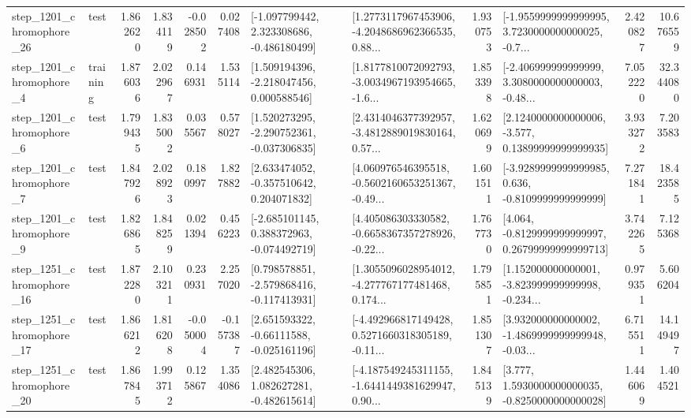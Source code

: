 \begin{tabular}{llrrrrllrlrr}
 step\_1201\_chromophore\_26 &      test &      1.862620 &    1.834119 &     -0.028502 &  0.027408 &   [-1.097799442, 2.323308686, -0.486180499] &  [1.2773117967453906, -4.2048686962366535, 0.88... &       1.930753 &  [-1.9559999999999995, 3.7230000000000025, -0.7... &            2.420827 &         10.676559 \\
  step\_1201\_chromophore\_4 &  training &      1.876036 &    2.022967 &      0.146931 &  1.535114 &    [1.509194396, -2.218047456, 0.000588546] &  [1.8177810072092793, -3.0034967193954665, -1.6... &       1.853398 &  [-2.406999999999999, 3.3080000000000003, -0.48... &            7.052220 &         32.344080 \\
  step\_1201\_chromophore\_6 &      test &      1.799435 &    1.835002 &      0.035567 &  0.578027 &   [1.520273295, -2.290752361, -0.037306835] &  [2.4314046377392957, -3.4812889019830164, 0.57... &       1.620699 &  [2.1240000000000006, -3.577, 0.13899999999999935] &            3.933272 &          7.203583 \\
  step\_1201\_chromophore\_7 &      test &      1.847926 &    2.028923 &      0.180997 &  1.827882 &    [2.633474052, -0.357510642, 0.204071832] &  [4.060976546395518, -0.5602160653251367, -0.49... &       1.601511 &  [-3.9289999999999985, 0.636, -0.8109999999999999] &            7.271841 &         18.423585 \\
  step\_1201\_chromophore\_9 &      test &      1.826865 &    1.848259 &      0.021394 &  0.456223 &   [-2.685101145, 0.388372963, -0.074492719] &  [4.405086303330582, -0.6658367357278926, -0.22... &       1.767730 &  [4.064, -0.8129999999999997, 0.26799999999999713] &            3.742265 &          7.125368 \\
 step\_1251\_chromophore\_16 &      test &      1.872280 &    2.103211 &      0.230931 &  2.257020 &   [0.798578851, -2.579868416, -0.117413931] &  [1.3055096028954012, -4.277767177481468, 0.174... &       1.795851 &  [1.152000000000001, -3.823999999999998, -0.234... &            0.979351 &          5.606204 \\
 step\_1251\_chromophore\_17 &      test &      1.866212 &    1.816208 &     -0.050004 & -0.157387 &    [2.651593322, -0.66111588, -0.025161196] &  [-4.492966817149428, 0.5271660318305189, -0.11... &       1.851307 &  [3.932000000000002, -1.4869999999999948, -0.03... &            6.715511 &         14.149497 \\
 step\_1251\_chromophore\_20 &      test &      1.867845 &    1.993712 &      0.125867 &  1.354086 &    [2.482545306, 1.082627281, -0.482615614] &  [-4.187549245311155, -1.6441449381629947, 0.90... &       1.845139 &   [3.777, 1.5930000000000035, -0.8250000000000028] &            1.446069 &          1.404521 \\

\end{tabular}
